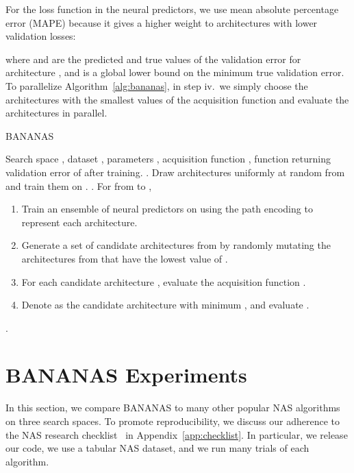 \documentclass[11pt]{article}
\numberwithin{equation}{section}
\numberwithin{figure}{section}
\theoremstyle{plain}
\theoremstyle{definition}
\begin{document}
For the loss function in the neural predictors, 
we use mean absolute percentage error (MAPE) because it gives a higher weight to
architectures with lower validation losses:

where  and  are the predicted and true values of the validation error for architecture , and  is a global lower bound on the minimum true validation error.
To parallelize Algorithm~\ref{alg:bananas}, in step iv.\ we simply choose the  architectures with the smallest values of the acquisition function and evaluate the architectures in parallel.


\begin{algorithm}
\caption{BANANAS}\label{alg:bananas}
\begin{algorithmic}  Search space , dataset , parameters , acquisition function , function  returning validation error of  after training.
. Draw  architectures  uniformly at random from  and train them on .
. For  from  to ,
\begin{enumerate}[label=\roman*., itemsep=1pt, parsep=1mm, topsep=1pt, leftmargin=8mm]
    \item 
Train an ensemble of neural predictors on 
using the path encoding to represent each architecture.
\item
Generate a set of  candidate architectures from  by
randomly mutating the  architectures  from 
that have the lowest value of .
\item 
For each candidate architecture , evaluate the acquisition function .
\item
Denote  as the candidate architecture with minimum , and evaluate .
\end{enumerate}
 .
\end{algorithmic}
\end{algorithm}


 
\section{BANANAS Experiments}
\label{sec:experiments}




In this section, we compare BANANAS to many other popular NAS algorithms
on three search spaces.
To promote reproducibility, we discuss our adherence to the 
NAS research checklist~\cite{lindauer2019best} in 
Appendix~\ref{app:checklist}.
In particular, we release our code, we use
a tabular NAS dataset, and we run many trials of each algorithm.
\end{document}
